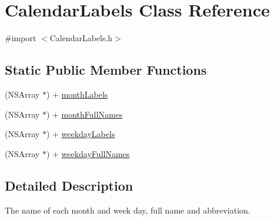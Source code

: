 \hypertarget{interface_calendar_labels}{\section{\-Calendar\-Labels \-Class \-Reference}
\label{interface_calendar_labels}
}


{\ttfamily \#import $<$\-Calendar\-Labels.\-h$>$}

\subsection*{\-Static \-Public \-Member \-Functions}
\begin{DoxyCompactItemize}
\item 
(\-N\-S\-Array $\ast$) + \hyperlink{interface_calendar_labels_ae5c1ae4bfefd17cb6b5ee6455f16d191}{month\-Labels}
\item 
(\-N\-S\-Array $\ast$) + \hyperlink{interface_calendar_labels_a38a5230b8cef47a05b1574d2235c0084}{month\-Full\-Names}
\item 
(\-N\-S\-Array $\ast$) + \hyperlink{interface_calendar_labels_ad293ccff4cf8f0ec9e195f6745adbd53}{weekday\-Labels}
\item 
(\-N\-S\-Array $\ast$) + \hyperlink{interface_calendar_labels_aa21867365c68e93d1cadeaf55df805ec}{weekday\-Full\-Names}
\end{DoxyCompactItemize}


\subsection{\-Detailed \-Description}
\-The name of each month and week day, full name and abbreviation. 


